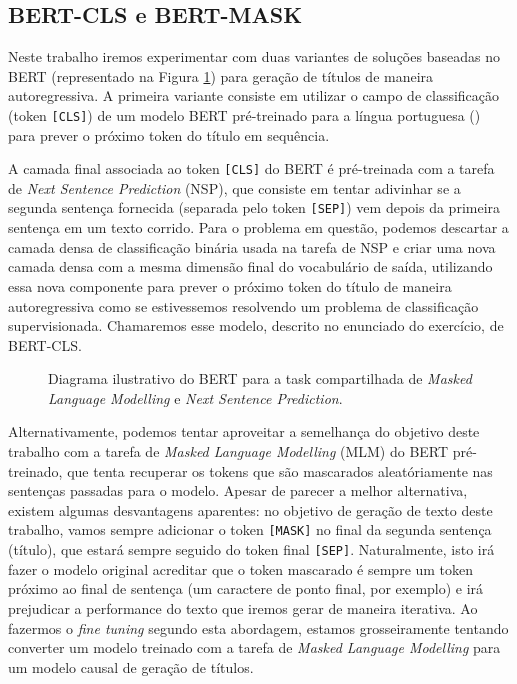 \documentclass{article}
\begin{document}
\subsection{BERT-CLS e BERT-MASK}

Neste trabalho iremos experimentar com duas variantes de soluções baseadas no BERT (representado na Figura \ref{bert_fig}) para geração de títulos de maneira autoregressiva. A primeira variante consiste em utilizar o campo de classificação (token \texttt{[CLS]}) de um modelo BERT pré-treinado para a língua portuguesa (\textcite{souza2020bertimbau}) para prever o próximo token do título em sequência.

A camada final associada ao token \texttt{[CLS]} do BERT é pré-treinada com a tarefa de \textit{Next Sentence Prediction} (NSP), que consiste em tentar adivinhar se a segunda sentença fornecida (separada pelo token \texttt{[SEP]}) vem depois da primeira sentença em um texto corrido. Para o problema em questão, podemos descartar a camada densa de classificação binária usada na tarefa de NSP e criar uma nova camada densa com a mesma dimensão final do vocabulário de saída, utilizando essa nova componente para prever o próximo token do título de maneira autoregressiva como se estivessemos resolvendo um problema de classificação supervisionada. Chamaremos esse modelo, descrito no enunciado do exercício, de BERT-CLS.

\begin{figure}[h]
	\centering
	
	\caption{Diagrama ilustrativo do BERT para a task compartilhada de \textit{Masked Language Modelling} e \textit{Next Sentence Prediction}. }
	\label{bert_fig}
\end{figure}

Alternativamente, podemos tentar aproveitar a semelhança do objetivo deste trabalho com a tarefa de \textit{Masked Language Modelling} (MLM) do BERT pré-treinado, que tenta recuperar os tokens que são mascarados aleatóriamente nas sentenças passadas para o modelo. Apesar de parecer a melhor alternativa, existem algumas desvantagens aparentes: no objetivo de geração de texto deste trabalho, vamos sempre adicionar o token \texttt{[MASK]} no final da segunda sentença (título), que estará sempre seguido do token final \texttt{[SEP]}. Naturalmente, isto irá fazer o modelo original acreditar que o token mascarado é sempre um token próximo ao final de sentença (um caractere de ponto final, por exemplo) e irá prejudicar a performance do texto que iremos gerar de maneira iterativa. Ao fazermos o \textit{fine tuning} segundo esta abordagem, estamos grosseiramente tentando converter um modelo treinado com a tarefa de \textit{Masked Language Modelling} para um modelo causal de geração de títulos.
\end{document}

